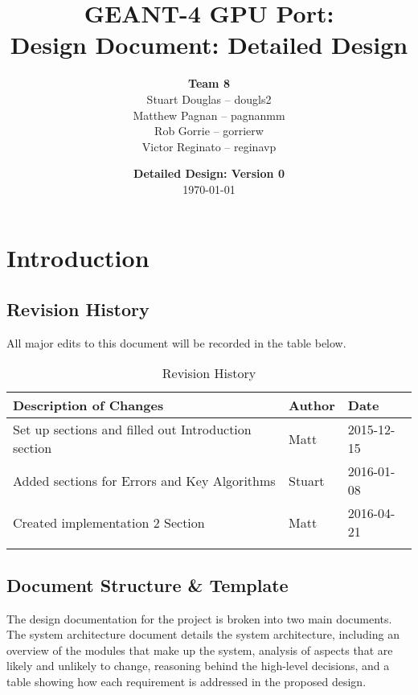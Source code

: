 \documentclass[12pt]{article}
\title{
\LARGE GEANT-4 GPU Port:
\\\vspace{10mm}
\large \textbf{Design Document: Detailed Design}
\vspace{40mm}
}
\author{
\textbf{Team 8}
\\Stuart Douglas -- dougls2
\\Matthew Pagnan -- pagnanmm
\\Rob Gorrie -- gorrierw
\\Victor Reginato -- reginavp
\vspace{10mm}
}
\date{\vfill \textbf{Detailed Design: Version 0}\\ \today}
\begin{document}

\maketitle
\newpage

\renewcommand{\contentsname}{Table of Contents}
\tableofcontents
\newpage
{}

\section{Introduction}
\subsection{Revision History}
All major edits to this document will be recorded in the table below.

\begin{table}[h]
\centering
\caption{Revision History}\label{Table_Revision}
\begin{tabular}{lll}

\toprule
\bf Description of Changes & \bf Author & \bf Date\\\midrule
\arrayrulecolor{lightgray}
Set up sections and filled out Introduction section & Matt & 2015-12-15\\\hline
Added sections for Errors and Key Algorithms & Stuart & 2016-01-08\\\hline
Created implementation 2 Section & Matt & 2016-04-21\\
\arrayrulecolor{black}
\bottomrule
\end{tabular}
\end{table}

\subsection{Document Structure \& Template}
The design documentation for the project is broken into two main documents.\\

The system architecture document details the system architecture, including an overview of the modules that make up the system, analysis of aspects that are likely and unlikely to change, reasoning behind the high-level decisions, and a table showing how each requirement is addressed in the proposed design.\\
\end{document}
